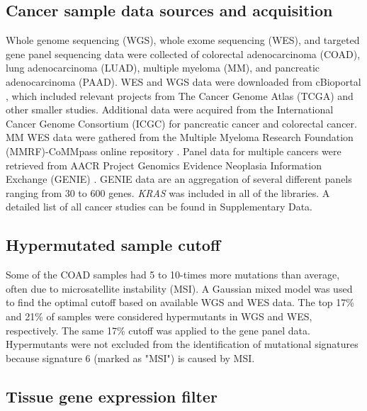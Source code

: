 \documentclass[english, 10pt, letterpaper]{article}
\newcommand{\KRAS}{\emph{KRAS}}
\begin{document}
\subsection*{Cancer sample data sources and acquisition}

Whole genome sequencing (WGS), whole exome sequencing (WES), and targeted gene panel sequencing data were collected of colorectal adenocarcinoma (COAD), lung adenocarcinoma (LUAD), multiple myeloma (MM), and pancreatic adenocarcinoma (PAAD).
WES and WGS data were downloaded from cBioportal \cite{Gao2013, Cerami2012}, which included relevant projects from The Cancer Genome Atlas (TCGA) \cite{CancerGenomeAtlasNetwork2012, CancerGenomeAtlasResearchNetwork2014, CancerGenomeAtlasResearchNetwork.Electronicaddress:andrew_aguirredfci.harvard.edu2017} and other smaller studies. 
Additional data were acquired from the International Cancer Genome Consortium (ICGC) for pancreatic cancer \cite{Scarlett2011} and colorectal cancer. 
MM WES data were gathered from the Multiple Myeloma Research Foundation (MMRF)-CoMMpass online repository \cite{Walker2019AAnalysis.}.
Panel data for multiple cancers were retrieved from AACR Project Genomics Evidence Neoplasia Information Exchange (GENIE) \cite{AACRProjectGENIEConsortium2017AACRConsortium.}.
GENIE data are an aggregation of several different panels ranging from 30 to 600 genes.
\KRAS{} was included in all of the libraries. 
A detailed list of all cancer studies can be found in Supplementary Data.


\subsection*{Hypermutated sample cutoff}

Some of the COAD samples had 5 to 10-times more mutations than average, often due to microsatellite instability (MSI). 
A Gaussian mixed model was used to find the optimal cutoff based on available WGS and WES data. 
The top 17\% and 21\% of samples were considered hypermutants in WGS and WES, respectively.
The same 17\% cutoff was applied to the gene panel data. 
Hypermutants were not excluded from the identification of mutational signatures because signature 6 (marked as "MSI") is caused by MSI.


\subsection*{Tissue gene expression filter}
\end{document}
